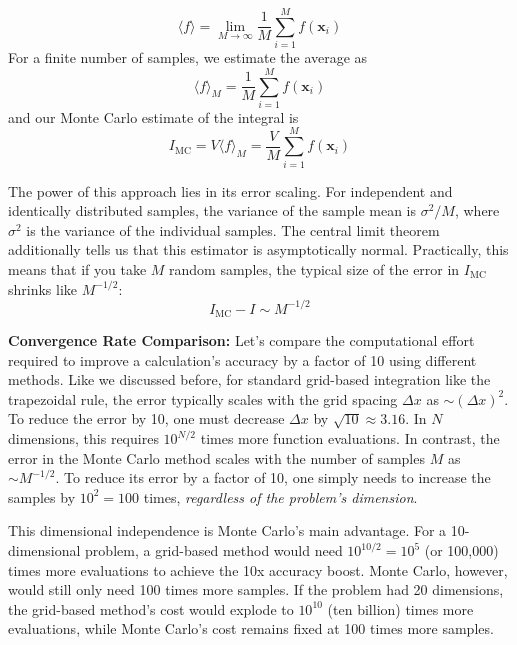 \begin{equation}
    \langle f \rangle = \lim_{M \to \infty} \frac{1}{M} \sum_{i=1}^{M} f(\mathbf{x}_i)
\end{equation}
For a finite number of samples, we estimate the average as
\begin{equation}
    \langle f \rangle_M = \frac{1}{M} \sum_{i=1}^{M} f(\mathbf{x}_i)
\end{equation}
and our Monte Carlo estimate of the integral is
\begin{equation}
    I_{\text{MC}} = V \langle f \rangle_M = \frac{V}{M} \sum_{i=1}^{M} f(\mathbf{x}_i)
\end{equation}

The power of this approach lies in its error scaling. For independent and identically distributed samples, the variance of the sample mean is $\sigma^2/M$, where $\sigma^2$ is the variance of the individual samples. The central limit theorem additionally tells us that this estimator is asymptotically normal. Practically, this means that if you take $M$ random samples, the typical size of the error in $I_{\text{MC}}$ shrinks like $M^{-1/2}$:
\begin{equation}
    I_{\text{MC}} - I \sim M^{-1/2}
\end{equation}

\begin{exampleBox}
    \textbf{Convergence Rate Comparison:} Let's compare the computational effort required to improve a calculation's accuracy by a factor of 10 using different methods. Like we discussed before, for standard grid-based integration like the trapezoidal rule, the error typically scales with the grid spacing $\Delta x$ as $\sim (\Delta x)^2$. To reduce the error by 10, one must decrease $\Delta x$ by $\sqrt{10} \approx 3.16$. In $N$ dimensions, this requires $10^{N/2}$ times more function evaluations. In contrast, the error in the Monte Carlo method scales with the number of samples $M$ as $\sim M^{-1/2}$. To reduce its error by a factor of 10, one simply needs to increase the samples by $10^2 = 100$ times, \emph{regardless of the problem's dimension}.
    
    This dimensional independence is Monte Carlo's main advantage. For a 10-dimensional problem, a grid-based method would need $10^{10/2} = 10^5$ (or 100,000) times more evaluations to achieve the 10x accuracy boost. Monte Carlo, however, would still only need 100 times more samples. If the problem had 20 dimensions, the grid-based method's cost would explode to $10^{10}$ (ten billion) times more evaluations, while Monte Carlo's cost remains fixed at 100 times more samples.
\end{exampleBox}

